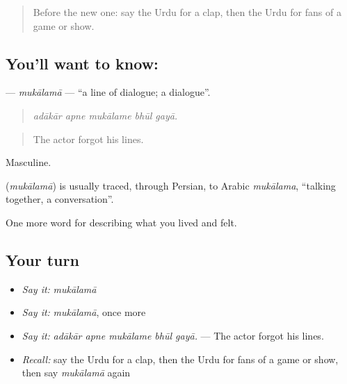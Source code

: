 \label{lesson:UR-C517-mukalama}



\begin{quote}
Before the new one: say the Urdu for a clap, then the Urdu for fans of a game or show.
\end{quote}

\subsection*{You'll want to know: }
\textbf{} — \emph{mukālamā} — \textquotedblleft{}a line of dialogue; a dialogue\textquotedblright{}.

\begin{quote}
    
\end{quote}

\begin{quote}
\emph{adākār apne mukālame bhūl gayā.}
\end{quote}

\begin{quote}
The actor forgot his lines.
\end{quote}

Masculine.

\begin{cousinweb}
\textbf{} (\emph{mukālamā}) is usually traced, through Persian, to Arabic \emph{mukālama}, \textquotedblleft{}talking together, a conversation\textquotedblright{}.
\end{cousinweb}

\begin{grammarlens}[title={What you've built}]
One more word for describing what you lived and felt.
\end{grammarlens}

\subsection*{Your turn}
\begin{itemize}
\raggedright
  \item \emph{Say it:} \emph{mukālamā}
  \item \emph{Say it:} \emph{mukālamā}, once more
  \item \emph{Say it:} \emph{adākār apne mukālame bhūl gayā.} — The actor forgot his lines.
  \item \emph{Recall:} say the Urdu for a clap, then the Urdu for fans of a game or show, then say \emph{mukālamā} again
\end{itemize}

